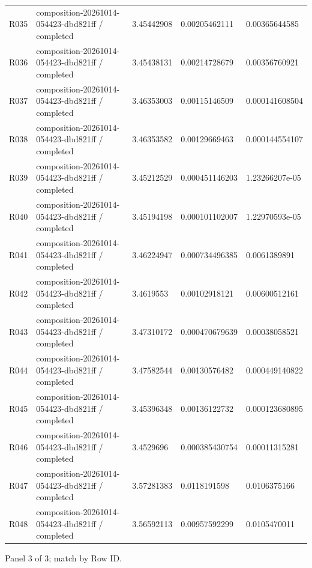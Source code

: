 \documentclass[10pt]{article}
\begin{document}
{\begin{longtable}{p{}p{}p{}p{}p{}}
R035 & composition-20261014-054423-dbd821ff / completed & 3.45442908 & 0.00205462111 & 0.00365644585 \\
R036 & composition-20261014-054423-dbd821ff / completed & 3.45438131 & 0.00214728679 & 0.00356760921 \\
R037 & composition-20261014-054423-dbd821ff / completed & 3.46353003 & 0.00115146509 & 0.000141608504 \\
R038 & composition-20261014-054423-dbd821ff / completed & 3.46353582 & 0.00129669463 & 0.000144554107 \\
R039 & composition-20261014-054423-dbd821ff / completed & 3.45212529 & 0.000451146203 & 1.23266207e-05 \\
R040 & composition-20261014-054423-dbd821ff / completed & 3.45194198 & 0.000101102007 & 1.22970593e-05 \\
R041 & composition-20261014-054423-dbd821ff / completed & 3.46224947 & 0.000734496385 & 0.0061389891 \\
R042 & composition-20261014-054423-dbd821ff / completed & 3.4619553 & 0.00102918121 & 0.00600512161 \\
R043 & composition-20261014-054423-dbd821ff / completed & 3.47310172 & 0.000470679639 & 0.00038058521 \\
R044 & composition-20261014-054423-dbd821ff / completed & 3.47582544 & 0.00130576482 & 0.000449140822 \\
R045 & composition-20261014-054423-dbd821ff / completed & 3.45396348 & 0.00136122732 & 0.000123680895 \\
R046 & composition-20261014-054423-dbd821ff / completed & 3.4529696 & 0.000385430754 & 0.00011315281 \\
R047 & composition-20261014-054423-dbd821ff / completed & 3.57281383 & 0.0118191598 & 0.0106375166 \\
R048 & composition-20261014-054423-dbd821ff / completed & 3.56592113 & 0.00957592299 & 0.0105470011 \\
\end{longtable}}
\par\noindent Panel 3 of 3; match by Row ID.
\end{document}
